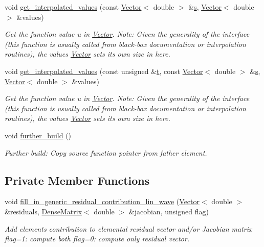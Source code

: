 \begin{DoxyCompactItemize}
void \hyperlink{classoomph_1_1RefineableLinearWaveEquations_a057892661a261b6959c3690f6b6e9a6a}{get\+\_\+interpolated\+\_\+values} (const \hyperlink{classoomph_1_1Vector}{Vector}$<$ double $>$ \&\hyperlink{cfortran_8h_ab7123126e4885ef647dd9c6e3807a21c}{s}, \hyperlink{classoomph_1_1Vector}{Vector}$<$ double $>$ \&values)
\begin{DoxyCompactList}\small\item\em Get the function value u in \hyperlink{classoomph_1_1Vector}{Vector}. Note\+: Given the generality of the interface (this function is usually called from black-\/box documentation or interpolation routines), the values \hyperlink{classoomph_1_1Vector}{Vector} sets its own size in here. \end{DoxyCompactList}\item 
void \hyperlink{classoomph_1_1RefineableLinearWaveEquations_a6e1d14ebf648099505632c4b3f9ba141}{get\+\_\+interpolated\+\_\+values} (const unsigned \&\hyperlink{cfortran_8h_af6f0bd3dc13317f895c91323c25c2b8f}{t}, const \hyperlink{classoomph_1_1Vector}{Vector}$<$ double $>$ \&\hyperlink{cfortran_8h_ab7123126e4885ef647dd9c6e3807a21c}{s}, \hyperlink{classoomph_1_1Vector}{Vector}$<$ double $>$ \&values)
\begin{DoxyCompactList}\small\item\em Get the function value u in \hyperlink{classoomph_1_1Vector}{Vector}. Note\+: Given the generality of the interface (this function is usually called from black-\/box documentation or interpolation routines), the values \hyperlink{classoomph_1_1Vector}{Vector} sets its own size in here. \end{DoxyCompactList}\item 
void \hyperlink{classoomph_1_1RefineableLinearWaveEquations_ad737613ce4a9b64210bf55230d0dcf47}{further\+\_\+build} ()
\begin{DoxyCompactList}\small\item\em Further build\+: Copy source function pointer from father element. \end{DoxyCompactList}\end{DoxyCompactItemize}
\subsection*{Private Member Functions}
\begin{DoxyCompactItemize}
\item 
void \hyperlink{classoomph_1_1RefineableLinearWaveEquations_a0521c661521a3934edd4c25733196932}{fill\+\_\+in\+\_\+generic\+\_\+residual\+\_\+contribution\+\_\+lin\+\_\+wave} (\hyperlink{classoomph_1_1Vector}{Vector}$<$ double $>$ \&residuals, \hyperlink{classoomph_1_1DenseMatrix}{Dense\+Matrix}$<$ double $>$ \&jacobian, unsigned flag)
\begin{DoxyCompactList}\small\item\em Add element\textquotesingle{}s contribution to elemental residual vector and/or Jacobian matrix flag=1\+: compute both flag=0\+: compute only residual vector. \end{DoxyCompactList}\end{DoxyCompactItemize}
